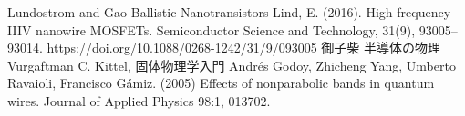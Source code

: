 \documentclass[11pt,uplatex,a4paper]{jsarticle}
\begin{document}
\begin{thebibliography}{99}
   Lundostrom and Gao Ballistic Nanotransistors
   ﻿Lind, E. (2016). High frequency III{\textendash}V nanowire MOSFETs. Semiconductor Science and Technology, 31(9), 93005–93014. https://doi.org/10.1088/0268-1242/31/9/093005
   御子柴 半導体の物理
   Vurgaftman
   C. Kittel, 固体物理学入門
   Andr\'es Godoy, Zhicheng Yang, Umberto Ravaioli, Francisco Gámiz. (2005) Effects of nonparabolic bands in quantum wires. Journal of Applied Physics 98:1, 013702. 
\end{thebibliography}
\end{document}
